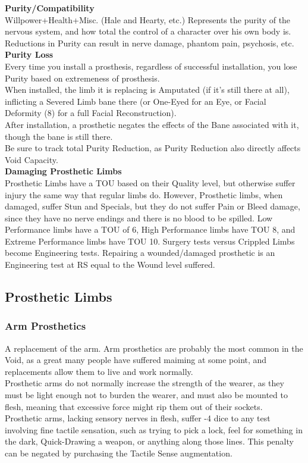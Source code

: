 \documentclass[a4paper, twocolumn, openany]{book}
\begin{document}
{{\bfseries Purity/Compatibility\\}
Willpower+Health+Misc. (Hale and Hearty, etc.)
Represents the purity of the nervous system, and how total the control of a character over his
own body is. Reductions in Purity can result in nerve damage, phantom pain, psychosis, etc.\\

{\bfseries Purity Loss\\}
Every time you install a prosthesis, regardless of successful installation, you lose Purity based
on extremeness of prosthesis.\\

When installed, the limb it is replacing is Amputated (if it’s still there at all), inflicting a Severed
Limb bane there (or One-Eyed for an Eye, or Facial Deformity (8) for a full Facial
Reconstruction).\\
After installation, a prosthetic negates the effects of the Bane associated with it, though the
bane is still there.\\

Be sure to track total Purity Reduction, as Purity Reduction also directly affects Void Capacity.\\

{\bfseries Damaging Prosthetic Limbs\\}
Prosthetic Limbs have a TOU based on their Quality level, but otherwise suffer injury the same
way that regular limbs do. However, Prosthetic limbs, when damaged, suffer Stun and Specials,
but they do not suffer Pain or Bleed damage, since they have no nerve endings and there is no
blood to be spilled. Low Performance limbs have a TOU of 6, High Performance limbs have
TOU 8, and Extreme Performance limbs have TOU 10. Surgery tests versus Crippled Limbs
become Engineering tests. Repairing a wounded/damaged prosthetic is an Engineering test at
RS equal to the Wound level suffered.\\

\subsection{Prosthetic Limbs}

\subsubsection{Arm Prosthetics}
A replacement of the arm. Arm prosthetics are probably the most common in the Void, as a
great many people have suffered maiming at some point, and replacements allow them to live
and work normally.\\
Prosthetic arms do not normally increase the strength of the wearer, as they must be light
enough not to burden the wearer, and must also be mounted to flesh, meaning that excessive
force might rip them out of their sockets.\\
Prosthetic arms, lacking sensory nerves in flesh, suffer -4 dice to any test involving fine tactile
sensation, such as trying to pick a lock, feel for something in the dark, Quick-Drawing a weapon,
or anything along those lines. This penalty can be negated by purchasing the Tactile Sense
augmentation.\\

}
\end{document}
